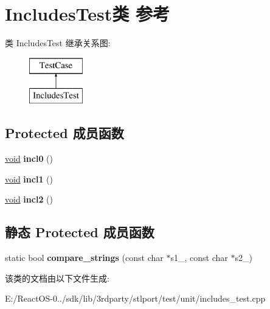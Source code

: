 \hypertarget{class_includes_test}{}\section{Includes\+Test类 参考}
\label{class_includes_test}
类 Includes\+Test 继承关系图\+:\begin{figure}[H]
\begin{center}
\leavevmode
\includegraphics[height=2.000000cm]{class_includes_test}
\end{center}
\end{figure}
\subsection*{Protected 成员函数}
\begin{DoxyCompactItemize}
\item 
\mbox{\label{class_includes_test_a20a3c075f6f7706783e749c47d6fbfbb}} 
\hyperlink{interfacevoid}{void} {\bfseries incl0} ()
\item 
\mbox{\label{class_includes_test_a1db9e9f88bebd33ac2237d671e04cc07}} 
\hyperlink{interfacevoid}{void} {\bfseries incl1} ()
\item 
\mbox{\label{class_includes_test_ac6a82aa60a36624e85a14db2bb7f3ad1}} 
\hyperlink{interfacevoid}{void} {\bfseries incl2} ()
\end{DoxyCompactItemize}
\subsection*{静态 Protected 成员函数}
\begin{DoxyCompactItemize}
\item 
\mbox{\label{class_includes_test_ae4b3efb450e7e07ba882fa912dc53371}} 
static bool {\bfseries compare\+\_\+strings} (const char $\ast$s1\+\_\+, const char $\ast$s2\+\_\+)
\end{DoxyCompactItemize}


该类的文档由以下文件生成\+:\begin{DoxyCompactItemize}
\item 
E\+:/\+React\+O\+S-\/0../sdk/lib/3rdparty/stlport/test/unit/includes\+\_\+test.\+cpp\end{DoxyCompactItemize}
